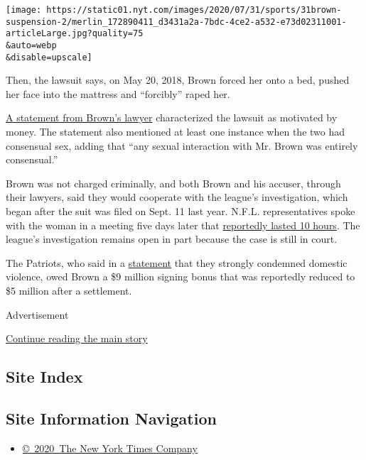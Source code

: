 \texttt{[image: https://static01.nyt.com/images/2020/07/31/sports/31brown-suspension-2/merlin\_172890411\_d3431a2a-7bdc-4ce2-a532-e73d02311001-articleLarge.jpg?quality=75\\\&auto=webp\\\&disable=upscale]}

Then, the lawsuit says, on May 20, 2018, Brown forced her onto a bed,
pushed her face into the mattress and ``forcibly'' raped her.

\href{https://twitter.com/DarrenHeitner/status/1171584983280095233?s=20}{A
statement from Brown's lawyer} characterized the lawsuit as motivated by
money. The statement also mentioned at least one instance when the two
had consensual sex, adding that ``any sexual interaction with Mr. Brown
was entirely consensual.''

Brown was not charged criminally, and both Brown and his accuser,
through their lawyers, said they would cooperate with the league's
investigation, which began after the suit was filed on Sept. 11 last
year. N.F.L. representatives spoke with the woman in a meeting five days
later that
\href{https://sports.yahoo.com/the-nfl-has-interviewed-antonio-browns-accuser-now-roger-goodell-has-a-decision-to-make-014530565.html}{reportedly
lasted 10 hours}. The league's investigation remains open in part
because the case is still in court.

The Patriots, who said in a
\href{https://twitter.com/nick_underhill/status/1171631870607613957}{statement}
that they strongly condemned domestic violence, owed Brown a \$9 million
signing bonus that was reportedly reduced to \$5 million after a
settlement.

Advertisement

\protect\hyperlink{after-bottom}{Continue reading the main story}

\hypertarget{site-index}{%
\subsection{Site Index}\label{site-index}}

\hypertarget{site-information-navigation}{%
\subsection{Site Information
Navigation}\label{site-information-navigation}}

\begin{itemize}
\tightlist
\item
  \href{https://help.nytimes.com/hc/en-us/articles/115014792127-Copyright-notice}{©~2020~The
  New York Times Company}
\end{itemize}

